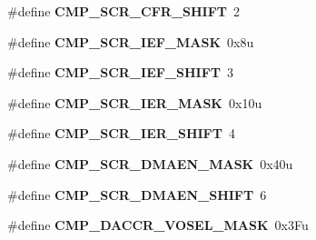 \begin{DoxyCompactItemize}
\item 
\hypertarget{group___c_m_p___register___masks_ga78595d16db987c96e73ce96fc5436f6b}{}\#define {\bfseries C\+M\+P\+\_\+\+S\+C\+R\+\_\+\+C\+F\+R\+\_\+\+S\+H\+I\+F\+T}~2\label{group___c_m_p___register___masks_ga78595d16db987c96e73ce96fc5436f6b}

\item 
\hypertarget{group___c_m_p___register___masks_gab36859944bb484db243358bb9a1a9692}{}\#define {\bfseries C\+M\+P\+\_\+\+S\+C\+R\+\_\+\+I\+E\+F\+\_\+\+M\+A\+S\+K}~0x8u\label{group___c_m_p___register___masks_gab36859944bb484db243358bb9a1a9692}

\item 
\hypertarget{group___c_m_p___register___masks_gaa9d242eac081d0d572e120ea3afa0e6f}{}\#define {\bfseries C\+M\+P\+\_\+\+S\+C\+R\+\_\+\+I\+E\+F\+\_\+\+S\+H\+I\+F\+T}~3\label{group___c_m_p___register___masks_gaa9d242eac081d0d572e120ea3afa0e6f}

\item 
\hypertarget{group___c_m_p___register___masks_ga2fbc99fb91c41e37b82ecabda7a9f0c7}{}\#define {\bfseries C\+M\+P\+\_\+\+S\+C\+R\+\_\+\+I\+E\+R\+\_\+\+M\+A\+S\+K}~0x10u\label{group___c_m_p___register___masks_ga2fbc99fb91c41e37b82ecabda7a9f0c7}

\item 
\hypertarget{group___c_m_p___register___masks_ga24fc92779af70d4d7fc87102c53b86ca}{}\#define {\bfseries C\+M\+P\+\_\+\+S\+C\+R\+\_\+\+I\+E\+R\+\_\+\+S\+H\+I\+F\+T}~4\label{group___c_m_p___register___masks_ga24fc92779af70d4d7fc87102c53b86ca}

\item 
\hypertarget{group___c_m_p___register___masks_ga217e649d3512ff1bba2c22885d768148}{}\#define {\bfseries C\+M\+P\+\_\+\+S\+C\+R\+\_\+\+D\+M\+A\+E\+N\+\_\+\+M\+A\+S\+K}~0x40u\label{group___c_m_p___register___masks_ga217e649d3512ff1bba2c22885d768148}

\item 
\hypertarget{group___c_m_p___register___masks_gafafda406631ad26c72187f4df02df484}{}\#define {\bfseries C\+M\+P\+\_\+\+S\+C\+R\+\_\+\+D\+M\+A\+E\+N\+\_\+\+S\+H\+I\+F\+T}~6\label{group___c_m_p___register___masks_gafafda406631ad26c72187f4df02df484}

\item 
\hypertarget{group___c_m_p___register___masks_gaf785bdf33cec5e0e8d03022bd7d92022}{}\#define {\bfseries C\+M\+P\+\_\+\+D\+A\+C\+C\+R\+\_\+\+V\+O\+S\+E\+L\+\_\+\+M\+A\+S\+K}~0x3\+Fu\label{group___c_m_p___register___masks_gaf785bdf33cec5e0e8d03022bd7d92022}


\end{DoxyCompactItemize}
